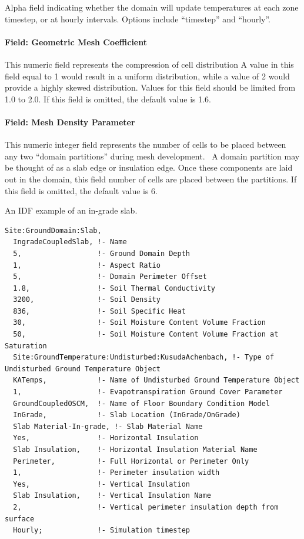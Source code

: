 Alpha field indicating whether the domain will update temperatures at each zone timestep, or at hourly intervals. Options include ``timestep'' and ``hourly''.

\paragraph{Field: Geometric Mesh Coefficient}

This numeric field represents the compression of cell distribution A value in this field equal to 1 would result in a uniform distribution, while a value of 2 would provide a highly skewed distribution. Values for this field should be limited from 1.0 to 2.0. If this field is omitted, the default value is 1.6.

\paragraph{Field: Mesh Density Parameter}

This numeric integer field represents the number of cells to be placed between any two ``domain partitions'' during mesh development.~ A domain partition may be thought of as a slab edge or insulation edge. Once these components are laid out in the domain, this field number of cells are placed between the partitions. If this field is omitted, the default value is 6.

An IDF example of an in-grade slab.

\begin{lstlisting}
Site:GroundDomain:Slab,
  IngradeCoupledSlab, !- Name
  5,                  !- Ground Domain Depth
  1,                  !- Aspect Ratio
  5,                  !- Domain Perimeter Offset
  1.8,                !- Soil Thermal Conductivity
  3200,               !- Soil Density
  836,                !- Soil Specific Heat
  30,                 !- Soil Moisture Content Volume Fraction
  50,                 !- Soil Moisture Content Volume Fraction at Saturation
  Site:GroundTemperature:Undisturbed:KusudaAchenbach, !- Type of Undisturbed Ground Temperature Object
  KATemps,            !- Name of Undisturbed Ground Temperature Object
  1,                  !- Evapotranspiration Ground Cover Parameter
  GroundCoupledOSCM,  !- Name of Floor Boundary Condition Model
  InGrade,            !- Slab Location (InGrade/OnGrade)
  Slab Material-In-grade, !- Slab Material Name
  Yes,                !- Horizontal Insulation
  Slab Insulation,    !- Horizontal Insulation Material Name
  Perimeter,          !- Full Horizontal or Perimeter Only
  1,                  !- Perimeter insulation width
  Yes,                !- Vertical Insulation
  Slab Insulation,    !- Vertical Insulation Name
  2,                  !- Vertical perimeter insulation depth from surface
  Hourly;             !- Simulation timestep
\end{lstlisting}

